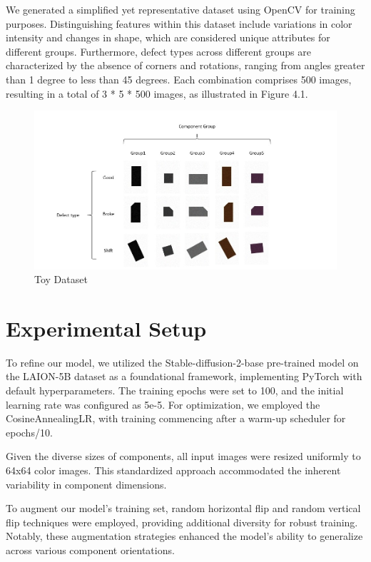 We generated a simplified yet representative dataset using OpenCV for training purposes. Distinguishing features within this dataset include variations in color intensity and changes in shape, which are considered unique attributes for different groups. Furthermore, defect types across different groups are characterized by the absence of corners and rotations, ranging from angles greater than 1 degree to less than 45 degrees. Each combination comprises 500 images, resulting in a total of 3 * 5 * 500 images, as illustrated in Figure 4.1.
\begin{figure}[H]
    \centering
    \includegraphics[width=1\linewidth]{Toy Dataset.png}
    \caption{Toy Dataset}
    \label{fig:enter-label}
\end{figure}

\section{Experimental Setup}
\label{sec:quote}
To refine our model, we utilized the Stable-diffusion-2-base pre-trained model on the LAION-5B dataset as a foundational framework, implementing PyTorch with default hyperparameters. The training epochs were set to 100, and the initial learning rate was configured as 5e-5. For optimization, we employed the CosineAnnealingLR, with training commencing after a warm-up scheduler for epochs/10.

Given the diverse sizes of components, all input images were resized uniformly to 64x64 color images. This standardized approach accommodated the inherent variability in component dimensions.

To augment our model's training set, random horizontal flip and random vertical flip techniques were employed, providing additional diversity for robust training. Notably, these augmentation strategies enhanced the model's ability to generalize across various component orientations.

